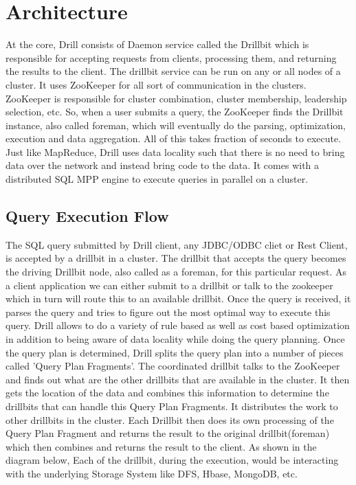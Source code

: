 \documentclass[9pt,twocolumn,twoside]{../../styles/osajnl}
\begin{document}
\section{Architecture}
	At the core, Drill consists of Daemon service called the Drillbit
	\cite{Drillbit} which is responsible for accepting requests from clients,
	processing them, and returning the results to the client. The drillbit service
	can be run on any or all nodes of a cluster. It uses
	ZooKeeper\cite{Apache-Zookeeper} for all sort of communication in the clusters.
	ZooKeeper is responsible for cluster combination, cluster membership, leadership
	selection, etc. So, when a user submits a query, the ZooKeeper finds the
	Drillbit instance, also called foreman, which will eventually do the parsing,
	optimization, execution and data aggregation. All of this takes fraction of
	seconds to execute. Just like MapReduce, Drill uses data locality such that
	there is no need to bring data over the network and instead bring code to the
	data. It comes with a distributed SQL MPP engine to execute queries in parallel
	on a cluster. 

\subsection{Query Execution Flow}
	The SQL query submitted by Drill client, any JDBC/ODBC cliet or Rest Client, is
	accepted by a drillbit in a cluster. The drillbit that accepts the query becomes
	the driving Drillbit node, also called as a foreman, for this particular
	request. As a client application we can either submit to a drillbit or talk to
	the zookeeper which in turn will route this to an available drillbit. Once the
	query is received, it parses the query and tries to figure out the most optimal
	way to execute this query. Drill allows to do a variety of rule based as well as
	cost based optimization in addition to being aware of data locality while doing
	the query planning. Once the query plan is determined, Drill splits the query
	plan into a number of pieces called 'Query Plan Fragments'. The coordinated
	drillbit talks to the ZooKeeper and finds out what are the other drillbits that
	are available in the cluster. It then gets the location of the data and combines
	this information to determine the drillbits that can handle this Query Plan
	Fragments. It distributes the work to other drillbits in the cluster. Each
	Drillbit then does its own processing of the Query Plan Fragment and returns the
	result to the original drillbit(foreman) which then combines and returns the
	result to the client. As shown in the diagram below, Each of the drillbit,
	during the execution, would be interacting with the underlying Storage System
	like DFS, Hbase, MongoDB, etc.
	
\end{document}
